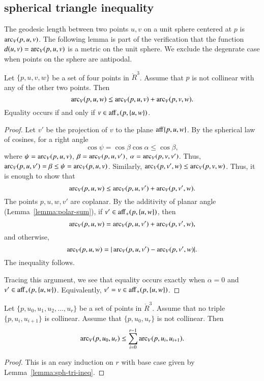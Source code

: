 \subsection{spherical triangle inequality}

The geodesic length between two points
$u,v$ on a unit sphere centered at $p$ is $\operatorname{arc}_V(p,u,v)$.
The following lemma is part of the verification that
the function $d(u,v) = \operatorname{arc}_V(p,u,v)$ is a metric
on the unit sphere.  We exclude the degenrate case when
points on the sphere are antipodal.

\begin{lemma}\label{lemma:sph-tri-ineq}
Let $\{p,u,v,w\}$ be a set of four points in $\ring{R}^3$.
Assume that $p$ is not collinear with any of the other two points.
Then
   $$
   \operatorname{arc}_V(p,u,w) \le \operatorname{arc}_V(p,u,v) + \operatorname{arc}_V(p,v,w).
   $$
Equality occurs if and only if $v\in{\operatorname{aff}}_+(p,\{u,w\})$.
\end{lemma}

\begin{proof} Let $v'$ be the projection of $v$ to the plane
${\operatorname{aff}}\{p,u,w\}$.  
By the spherical law of cosines, for a right angle
   $$
   \cos\psi = \cos\beta\cos\alpha \le \cos\beta,
   $$
where $\psi = \operatorname{arc}_V(p,u,v)$, $\beta = \operatorname{arc}_V(p,u,v')$, $\alpha=\operatorname{arc}_V(p,v,v')$.
Thus, $\operatorname{arc}_V(p,u,v')=\beta\le \psi=\operatorname{arc}_V(p,u,v)$.
Similarly, $\operatorname{arc}_V(p,v',w) \le \operatorname{arc}_V(p,v,w)$.
Thus, it is enough to show that 
  $$
  \operatorname{arc}_V(p,u,w) \le \operatorname{arc}_V(p,u,v') + \operatorname{arc}_V(p,v',w).
  $$
The points $p,u,w,v'$ are coplanar.
By the additivity of planar angle (Lemma~\ref{lemma:polar-sum}), if 
$v'\in {\operatorname{aff}}_+(p,\{u,w\})$, then
   $$
   \operatorname{arc}_V(p,u,w) = \operatorname{arc}_V(p,u,v') + \operatorname{arc}_V(p,v',w),   
   $$
and otherwise,
   $$
   \operatorname{arc}_V(p,u,w) = |\operatorname{arc}_V(p,u,v') - \operatorname{arc}_V(p,v',w)|.
   $$
The inequality follows.

Tracing this argument, we see that equality occurs exactly when
$\alpha=0$ and $v'\in {\operatorname{aff}}_+(p,\{u,w\})$.  Equivalently,
$v'=v\in{\operatorname{aff}}_+(p,\{u,w\})$.
\end{proof}

\begin{lemma}\label{lemma:sph-tri-multi}
Let $\{p,u_0,u_1,u_2,\ldots,u_r\}$ be a set of points in $\ring{R}^3$.
Assume that no triple $\{p,u_i,u_{i+1}\}$ is collinear.  Assume
that $\{p,u_0,u_r\}$ is not collinear.  Then
$$
  \operatorname{arc}_V(p,u_0,u_r) \le \sum_{i=0}^{r-1} \operatorname{arc}_V(p,u_i,u_{i+1}).
$$
\end{lemma}

\begin{proof} This is an easy induction on $r$ with base
case given by Lemma~\ref{lemma:sph-tri-ineq}.
\end{proof}


